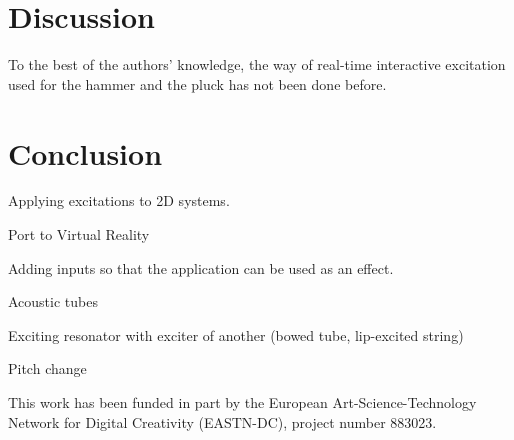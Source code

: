 \documentclass{article}
\begin{document}
\section{Discussion}
To the best of the authors' knowledge, the way of real-time interactive excitation used for the hammer and the pluck has not been done before. 


\section{Conclusion}

Applying excitations to 2D systems.

Port to Virtual Reality

Adding inputs so that the application can be used as an effect. 

Acoustic tubes

Exciting resonator with exciter of another (bowed tube, lip-excited string)

Pitch change


\begin{acknowledgments}
This work has been funded in part by the European Art-Science-Technology Network for Digital Creativity (EASTN-DC), project number 883023.
\end{acknowledgments} 


\end{document}
